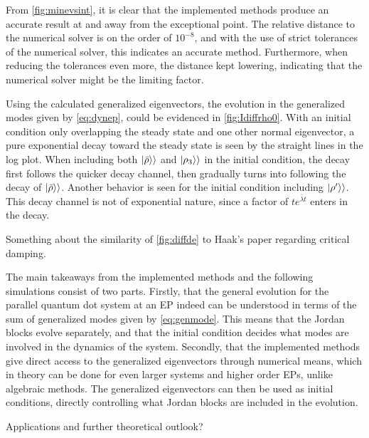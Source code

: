 \documentclass[../main.tex]{subfiles}
\begin{document}
From \cref{fig:minevsint}, it is clear that the implemented methods produce an accurate result at and away from the exceptional point. The relative distance to the numerical solver is on the order of $10^{-8}$, and with the use of strict tolerances of the numerical solver, this indicates an accurate method. Furthermore, when reducing the tolerances even more, the distance kept lowering, indicating that the numerical solver might be the limiting factor.

Using the calculated generalized eigenvectors, the evolution in the generalized modes given by \cref{eq:dynep}, could be evidenced in \cref{fig:Idiffrho0}. With an initial condition only overlapping the steady state and one other normal eigenvector, a pure exponential decay toward the steady state is seen by the straight lines in the log plot. When including both $\ket{\bar \rho}\rangle$ and $\ket{\rho_3}\rangle$ in the initial condition, the decay first follows the quicker decay channel, then gradually turns into following the decay of $\ket{\bar\rho}\rangle$. Another behavior is seen for the initial condition including $\ket{\rho'}\rangle$. This decay channel is not of exponential nature, since a factor of $te^{\bar\lambda t}$ enters in the decay. 

Something about the similarity of \cref{fig:diffde} to Haak's paper regarding critical damping.

The main takeaways from the implemented methods and the following simulations consist of two parts. Firstly, that the general evolution for the parallel quantum dot system at an EP indeed can be understood in terms of the sum of generalized modes given by \cref{eq:genmode}. This means that the Jordan blocks evolve separately, and that the initial condition decides what modes are involved in the dynamics of the system. Secondly, that the implemented methods give direct access to the generalized eigenvectors through numerical means, which in theory can be done for even larger systems and higher order EPs, unlike algebraic methods. The generalized eigenvectors can then be used as initial conditions, directly controlling what Jordan blocks are included in the evolution.

Applications and further theoretical outlook?
\end{document}

